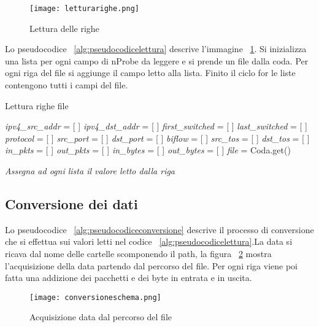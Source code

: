 \documentclass[../main.tex]{subfiles}
\begin{document}
\begin{figure}[H]
				\centering
\texttt{[image: letturarighe.png]}
				\caption{Lettura delle righe}
				\label{fig:letturarighe}
\end{figure}


Lo pseudocodice ~\ref{alg:pseudocodicelettura} descrive l'immagine ~\ref{fig:letturarighe}. Si inizializza una lista per ogni campo di nProbe da leggere e si prende un file dalla coda. Per ogni riga del file si aggiunge il campo letto alla lista. Finito il ciclo for le liste contengono tutti i campi del file.

\begin{algorithm}[H]
\caption{Lettura righe file}
				\label{alg:pseudocodicelettura}
\begin{algorithmic}[1]
				\State \textit{ipv4\_src\_addr} = [ ]
				\State \textit{ipv4\_dst\_addr} = [ ]
				\State \textit{first\_switched} = [ ]
				\State \textit{last\_switched} = [ ]
				\State \textit{protocol} = [ ]
				\State \textit{src\_port} = [ ]
				\State \textit{dst\_port} = [ ]
				\State \textit{biflow} = [ ]
				\State \textit{src\_tos} = [ ]
				\State \textit{dst\_tos} = [ ]
				\State \textit{in\_pkts} = [ ]
				\State \textit{out\_pkts} = [ ]
				\State \textit{in\_bytes} = [ ]
				\State \textit{out\_bytes} = [ ]
				\State \textit{file} = Coda.get()

						\State \textit{Assegna ad ogni lista il valore letto dalla riga}
				\EndFor
\end{algorithmic}
\end{algorithm}

\subsection{Conversione dei dati}
Lo pseudocodice ~\ref{alg:pseudocodiceconversione} descrive il processo di conversione che si effettua sui valori letti nel codice ~\ref{alg:pseudocodicelettura}.La data si ricava dal nome delle cartelle scomponendo il path, la figura ~\ref{fig:conversioneschema} mostra l'acquisizione della data partendo dal percorso del file. Per ogni riga viene poi fatta una addizione dei pacchetti e dei byte in entrata e in uscita.
\begin{figure}[H]
				\centering
\texttt{[image: conversioneschema.png]}
				\caption{Acquisizione data dal percorso del file}
				\label{fig:conversioneschema}
\end{figure}
\end{document}
